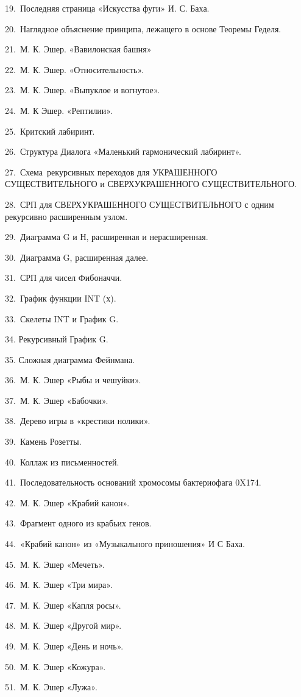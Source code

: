 19.~Последняя страница «Искусства фуги» И. С. Баха.

20.~Наглядное объяснение принципа, лежащего в основе Теоремы Геделя.

21.~М. К. Эшер. «Вавилонская башня»

22.~М. К. Эшер. «Относительность».

23.~М. К. Эшер. «Выпуклое и вогнутое».

24.~М. К Эшер. «Рептилии».

25.~Критский лабиринт.

26.~Структура Диалога «Маленький гармонический лабиринт».

27.~Схема~рекурсивных переходов для УКРАШЕННОГО СУЩЕСТВИТЕЛЬНОГО и СВЕРХУКРАШЕННОГО СУЩЕСТВИТЕЛЬНОГО.

28.~СРП для СВЕРХУКРАШЕННОГО СУЩЕСТВИТЕЛЬНОГО с одним рекурсивно расширенным узлом.

29.~Диаграмма G и Н, расширенная и нерасширенная.

30.~Диаграмма G, расширенная далее.

31.~СРП для чисел Фибоначчи.

32.~График функции INT (х).

33.~Скелеты INT и График G.

34. Рекурсивный График G.

35. Сложная диаграмма Фейнмана.

36.~М. К. Эшер «Рыбы и чешуйки».

37.~М. К. Эшер «Бабочки».

38.~Дерево игры в «крестики нолики».

39.~Камень Розетты.

40.~Коллаж из письменностей.

41.~Последовательность оснований хромосомы бактериофага 0X174.

42.~М. К. Эшер «Крабий канон».

43.~Фрагмент одного из крабьих генов.

44.~«Крабий канон» из «Музыкального приношения» И С Баха.

45.~М. К. Эшер «Мечеть».

46.~М. К. Эшер «Три мира».

47.~М. К. Эшер «Капля росы».

48.~М. К. Эшер «Другой мир».

49.~М. К. Эшер «День и ночь».

50.~М. К. Эшер «Кожура».

51.~М. К. Эшер «Лужа».

